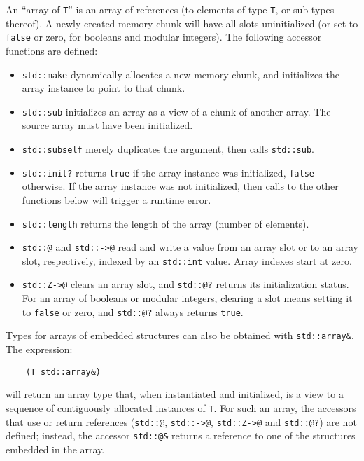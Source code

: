 An ``array of \verb|T|'' is an array of references (to elements of type
\verb|T|, or sub-types thereof). A newly created memory chunk will have
all slots uninitialized (or set to \verb|false| or zero, for booleans
and modular integers). The following accessor functions are defined:
\begin{itemize}

    \item \verb|std::make| dynamically allocates a new memory chunk,
    and initializes the array instance to point to that chunk.

    \item \verb|std::sub| initializes an array as a view of a chunk of
    another array. The source array must have been initialized.

    \item \verb|std::subself| merely duplicates the argument, then calls
    \verb|std::sub|.

    \item \verb|std::init?| returns \verb|true| if the array instance
    was initialized, \verb|false| otherwise. If the array instance was
    not initialized, then calls to the other functions below will
    trigger a runtime error.

    \item \verb|std::length| returns the length of the array (number of
    elements).

    \item \verb|std::@| and \verb|std::->@| read and write a value from
    an array slot or to an array slot, respectively, indexed by an
    \verb|std::int| value. Array indexes start at zero.

    \item \verb|std::Z->@| clears an array slot, and \verb|std::@?|
    returns its initialization status. For an array of booleans or
    modular integers, clearing a slot means setting it to \verb|false|
    or zero, and \verb|std::@?| always returns \verb|true|.

\end{itemize}

Types for arrays of embedded structures can also be obtained with
\verb|std::array&|. The expression:
\begin{verbatim}
    (T std::array&)
\end{verbatim}
will return an array type that, when instantiated and initialized, is
a view to a sequence of contiguously allocated instances of \verb|T|.
For such an array, the accessors that use or return references
(\verb|std::@|, \verb|std::->@|, \verb|std::Z->@| and \verb|std::@?|)
are not defined; instead, the accessor \verb|std::@&| returns a
reference to one of the structures embedded in the array.

